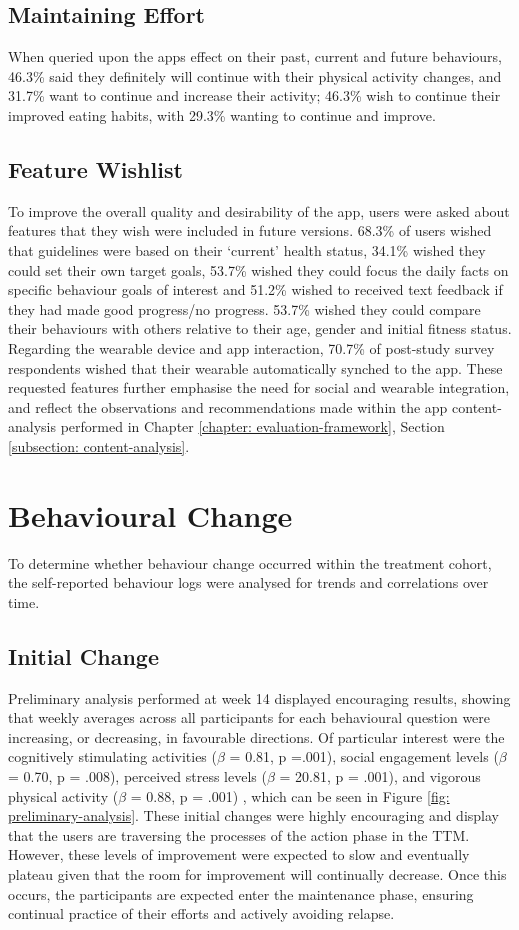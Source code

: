 \subsection{Maintaining Effort}
When queried upon the apps effect on their past, current and future behaviours, 46.3\% said they definitely will continue with their physical activity changes, and 31.7\% want to continue and increase their activity; 46.3\% wish to continue their improved eating habits, with 29.3\% wanting to continue and improve.

\subsection{Feature Wishlist}
To improve the overall quality and desirability of the app, users were asked about features that they wish were included in future versions.
68.3\% of users wished that guidelines were based on their ‘current’ health status, 34.1\% wished they could set their own target goals, 53.7\% wished they could focus the daily facts on specific behaviour goals of interest and 51.2\% wished to received text feedback if they had made good progress/no progress. 53.7\% wished they could compare their behaviours with others relative to their age, gender and initial fitness status. Regarding the wearable device and app interaction, 70.7\% of post-study survey respondents wished that their wearable automatically synched to the app.
These requested features further emphasise the need for social and wearable integration, and reflect the observations and recommendations made within the app content-analysis performed in Chapter \ref{chapter: evaluation-framework}, Section \ref{subsection: content-analysis}.

\section{Behavioural Change}
To determine whether behaviour change occurred within the treatment cohort, the self-reported behaviour logs were analysed for trends and correlations over time.

\subsection{Initial Change}
Preliminary analysis performed at week 14 displayed encouraging results, showing that weekly averages across all participants for each behavioural question were increasing, or decreasing, in favourable directions. Of particular interest were the  cognitively stimulating activities ($\beta$ = 0.81, p =.001), social engagement levels ($\beta$ = 0.70, p = .008), perceived stress levels ($\beta$ = 20.81, p = .001), and vigorous physical activity ($\beta$ = 0.88, p = .001) \cite{Norton2015-TRCI}, which can be seen in Figure \ref{fig: preliminary-analysis}. These initial changes were highly encouraging and display that the users are traversing the processes of the action phase in the TTM. However, these levels of improvement were expected to slow and eventually plateau given that the room for improvement will continually decrease. Once this occurs, the participants are expected enter the maintenance phase, ensuring continual practice of their efforts and actively avoiding relapse.


